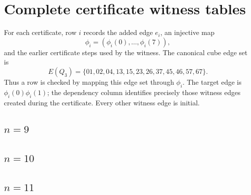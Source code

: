 \documentclass[11pt]{article}
\numberwithin{equation}{section}
\begin{document}
\newpage
\appendix

\section{Complete certificate witness tables}\label{app:witness}
For each certificate, row $i$ records the added edge $e_i$, an injective map
\[
\phi_i=(\phi_i(0),\ldots,\phi_i(7)),
\]
and the earlier certificate steps used by the witness. The canonical cube edge set is
\[
E(Q_3)=\{01,02,04,13,15,23,26,37,45,46,57,67\}.
\]
Thus a row is checked by mapping this edge set through $\phi_i$. The target edge is $\phi_i(0)\phi_i(1)$; the dependency column identifies precisely those witness edges created during the certificate. Every other witness edge is initial.

\subsection*{$n=9$}
\begingroup\scriptsize

\endgroup

\subsection*{$n=10$}
\begingroup\scriptsize

\endgroup

\subsection*{$n=11$}
\begingroup\scriptsize

\endgroup
\end{document}
